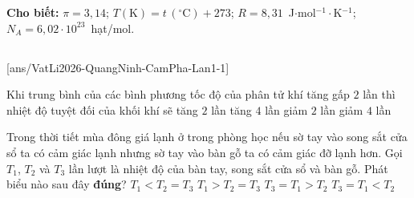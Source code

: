 \def\CheDo{solcolor}%
\def\tenchuong{THPT Cẩm Phả, Quảng Ninh -- Lần 1}
\def\thuonghieu{VẬT LÍ 12 -- Eduzy.com.vn}
\def\TachCauDS{1}
\def\TachCauLG{1}




	\noindent\textbf{Cho biết:} $\pi=3{,}14$; $T(\text{K})=t\,(^\circ\text{C})+273$; $R=8{,}31$~J$\cdot$mol$^{-1}\cdot$K$^{-1}$; $N_A=6{,}02\cdot 10^{23}$~hạt/mol.

	\noindent
	\subsection*{}
	\setcounter{ex}{0}
	[ans/VatLi2026-QuangNinh-CamPha-Lan1-1]

	\begin{ex}%
		Khi trung bình của các bình phương tốc độ của phân tử khí tăng gấp $2$ lần thì nhiệt độ tuyệt đối của khối khí sẽ
		\choice
		{\True tăng $2$ lần}
		{tăng $4$ lần}
		{giảm $2$ lần}
		{giảm $4$ lần}
	\end{ex}

	\begin{ex}%
		Trong thời tiết mùa đông giá lạnh ở trong phòng học nếu sờ tay vào song sắt cửa sổ ta có cảm giác lạnh nhưng sờ tay vào bàn gỗ ta có cảm giác đỡ lạnh hơn. Gọi $T_1$, $T_2$ và $T_3$ lần lượt là nhiệt độ của bàn tay, song sắt cửa sổ và bàn gỗ. Phát biểu nào sau đây \textbf{đúng}?
		\choice
		{$T_1<T_2=T_3$}
		{\True $T_1>T_2=T_3$}
		{$T_3=T_1>T_2$}
		{$T_3=T_1<T_2$}
	\end{ex}

